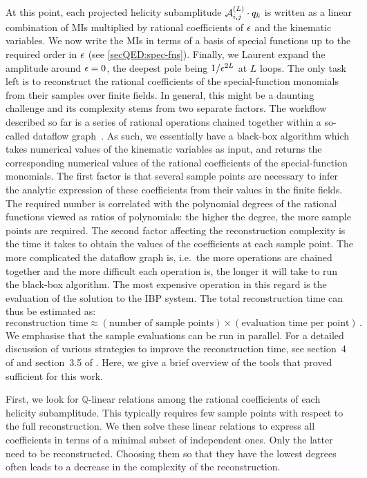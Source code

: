 \documentclass[main.tex]{subfiles}
\begin{document}
At this point, each projected helicity subamplitude $\mathcal{A}^{(L)}_{i,j}\cdot q_k$
is written as a linear combination of MIs multiplied by rational
coefficients of $\epsilon$ and the kinematic variables. We now write the MIs
in terms of a basis of special functions up to the required order in $\epsilon$
(see \cref{secQED:spec-fns}). Finally, we Laurent expand the amplitude around
$\epsilon=0$, the deepest pole being $1/\epsilon^{2 L}$ at $L$ loops. The only task
left is to reconstruct the rational coefficients of the special-function
monomials from their samples over finite fields. In general, this might be a
daunting challenge and its complexity stems from two separate factors. The
workflow described so far is a series of rational operations chained together
within a so-called dataflow graph~\cite{Peraro:2019svx}. As such, we
essentially have a black-box algorithm which takes numerical values of the
kinematic variables as input, and returns the corresponding numerical values of
the rational coefficients of the special-function monomials. The first factor
is that several sample points are necessary to infer the analytic expression of
these coefficients from their values in the finite fields. The required number
is correlated with the polynomial degrees of the rational functions viewed as
ratios of polynomials: the higher the degree, the more sample points are
required. The second factor affecting the reconstruction complexity is the time
it takes to obtain the values of the coefficients at each sample point. The
more complicated the dataflow graph is, i.e.~the more operations are chained
together and the more difficult each operation is, the longer it will take to
run the black-box algorithm. The most expensive operation in this regard is the
evaluation of the solution to the IBP system.  The total reconstruction
time can thus be estimated as:
\begin{equation} \label{eqQED:rectimeschematic}
	\text{reconstruction time} \approx (\text{number of sample points}) \times (\text{evaluation time per point})\,.
\end{equation}
We emphasise that the sample evaluations can be run in parallel.  For a
detailed discussion of various strategies to improve the reconstruction time,
see section~4 of  and section~3.5 of
. Here, we give a brief overview of the tools that
proved sufficient for this work.

First, we look for $\mathbb{Q}$-linear relations among the rational
coefficients of each helicity subamplitude. This typically requires few sample
points with respect to the full reconstruction. We then solve these linear
relations to express all coefficients in terms of a minimal subset of
independent ones. Only the latter need to be reconstructed. Choosing them so
that they have the lowest degrees often leads to a decrease in the complexity
of the reconstruction.
\end{document}
